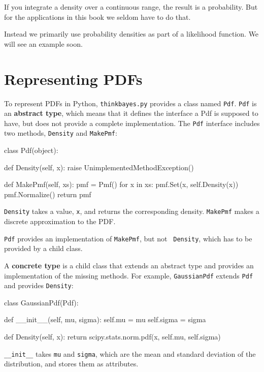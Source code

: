 \documentclass[12pt]{book}
\theoremstyle{exercise}
\begin{document}
If you integrate a density
over a continuous range, the result is a probability.  But 
for the applications in this book we seldom have to do that.

Instead we primarily use probability densities as part
of a likelihood function.  We will see an example soon.


\section{Representing PDFs}

To represent PDFs in Python,
{\tt thinkbayes.py} provides a class named {\tt Pdf}.
{\tt Pdf} is an {\bf abstract type}, which means that it defines
the interface a Pdf is supposed to have, but does not provide
a complete implementation.  The {\tt Pdf} interface includes
two methods, {\tt Density} and {\tt MakePmf}:

\begin{code}
class Pdf(object):

    def Density(self, x):
        raise UnimplementedMethodException()

    def MakePmf(self, xs):
        pmf = Pmf()
        for x in xs:
            pmf.Set(x, self.Density(x))
        pmf.Normalize()
        return pmf
\end{code}

{\tt Density} takes a value, {\tt x}, and returns the corresponding
density.  {\tt MakePmf} makes a discrete approximation to the PDF.

{\tt Pdf} provides an implementation of {\tt MakePmf}, but not {\tt
  Density}, which has to be provided by a child class.
  

A {\bf concrete type} is a child class that extends an abstract type
and provides an implementation of the missing methods.
For example, {\tt GaussianPdf} extends {\tt Pdf} and provides
{\tt Density}:

\begin{code}
class GaussianPdf(Pdf):

    def __init__(self, mu, sigma):
        self.mu = mu
        self.sigma = sigma
        
    def Density(self, x):
        return scipy.stats.norm.pdf(x, self.mu, self.sigma)
\end{code}

\verb"__init__" takes {\tt mu} and {\tt sigma}, which are
the mean and standard deviation of the distribution, and stores
them as attributes.
\end{document}
